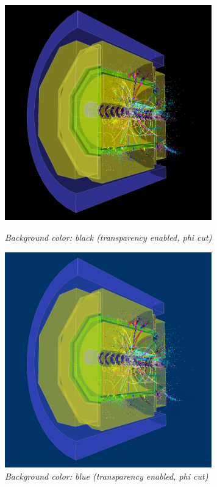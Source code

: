 \documentclass[a4paper,10pt]{article}
\begin{document}
\begin{figure}
\begin{minipage}[t]{6cm}
\centerline{\includegraphics[width=0.8\textwidth]{img/black.png}}
\caption{\label{CEDViewer} \textsl{Background color: black (transparency enabled, phi cut)}}
\end{minipage}
\hfill
\begin{minipage}[t]{6cm}
\setlength{\fboxsep}{0mm}
\centerline{\includegraphics[width=0.8\textwidth]{img/blue.png}}
\caption{\label{User viewer}\textsl{Background color: blue (transparency enabled, phi cut)}}
\end{minipage}
\end{figure}
\end{document}
